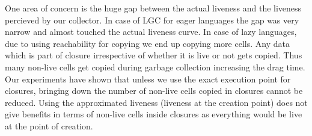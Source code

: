 \documentclass[9pt]{sigplanconf}
\newcommand{\comment}[1]{{\color{Myblue}{(#1)}}}
\begin{document}
One area  of concern is the  huge gap between the  actual liveness and
the liveness  percieved by  our collector.  In case  of LGC  for eager
languages  the gap  was  very  narrow and  almost  touched the  actual
liveness curve.  In case of  lazy languages, due to using reachability
for copying we  end up copying more  cells. Any data which  is part of
closure irrespective  of whether it is  live or not gets  copied. Thus
many non-live  cells get  copied during garbage  collection increasing
the drag  time.  Our  experiments have  shown that  unless we  use the
exact  execution  point  for  closures, bringing  down  the  number  of
non-live  cells  copied in  closures  cannot  be reduced.   Using  the
approximated liveness (liveness  at the creation point)  does not give
benefits  in terms  of non-live  cells inside  closures as  everything
would be live at the point of creation.
\end{document}
